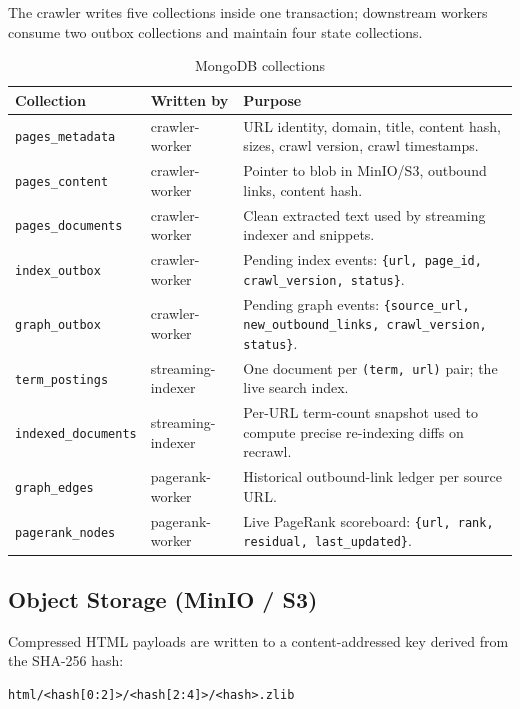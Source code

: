 \documentclass[11pt,a4paper]{article}
\newcommand{\code}[1]{\texttt{#1}}
\begin{document}
The crawler writes five collections inside one transaction; downstream workers consume two outbox collections and maintain four state collections.

\begin{table}[H]
\centering
\caption{MongoDB collections}
\begin{tabular}{p{}p{}p{}}
\toprule
Collection & Written by & Purpose \\
\midrule
\code{pages\_metadata} & crawler-worker & URL identity, domain, title, content hash, sizes, crawl version, crawl timestamps.\\
\code{pages\_content} & crawler-worker & Pointer to blob in MinIO/S3, outbound links, content hash.\\
\code{pages\_documents} & crawler-worker & Clean extracted text used by streaming indexer and snippets.\\
\code{index\_outbox} & crawler-worker & Pending index events: \code{\{url, page\_id, crawl\_version, status\}}.\\
\code{graph\_outbox} & crawler-worker & Pending graph events: \code{\{source\_url, new\_outbound\_links, crawl\_version, status\}}.\\
\code{term\_postings} & streaming-indexer & One document per \code{(term, url)} pair; the live search index.\\
\code{indexed\_documents} & streaming-indexer & Per-URL term-count snapshot used to compute precise re-indexing diffs on recrawl.\\
\code{graph\_edges} & pagerank-worker & Historical outbound-link ledger per source URL.\\
\code{pagerank\_nodes} & pagerank-worker & Live PageRank scoreboard: \code{\{url, rank, residual, last\_updated\}}.\\
\bottomrule
\end{tabular}
\end{table}

\subsection{Object Storage (MinIO / S3)}

Compressed HTML payloads are written to a content-addressed key derived from the SHA-256 hash:

\begin{lstlisting}
html/<hash[0:2]>/<hash[2:4]>/<hash>.zlib
\end{lstlisting}
\end{document}
